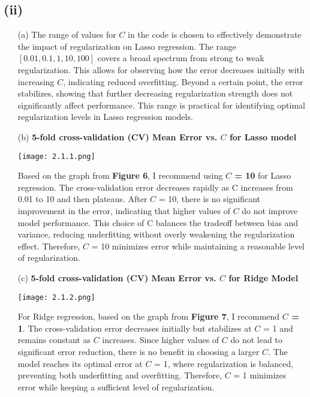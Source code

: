 \documentclass[a4paper,10pt]{article}
\begin{document}
    \subsection*{(ii)}
\begin{enumerate}
\item [(a)]
 The range of values for \( C \) in the code is chosen to effectively demonstrate the impact of regularization on Lasso regression. The range \([0.01, 0.1, 1, 10, 100]\) covers a broad spectrum from strong to weak regularization. This allows for observing how the error decreases initially with increasing \( C \), indicating reduced overfitting. Beyond a certain point, the error stabilizes, showing that further decreasing regularization strength does not significantly affect performance. This range is practical for identifying optimal regularization levels in Lasso regression models.
 \newpage
    \item[(b)] \textbf{5-fold cross-validation (CV) Mean Error vs.  \textbf{\(C\)} for Lasso model}
     \begin{center}
\centering
        \texttt{[image: 2.1.1.png]}
    \end{center}
    Based on the graph from \textbf{Figure 6}, I recommend using \textbf{\(C\) = 10} for Lasso regression. The cross-validation error decreases rapidly as C increases from 0.01 to 10 and then plateaus. After \(C\) = 10, there is no significant improvement in the error, indicating that higher values of \(C\) do not improve model performance. This choice of C balances the tradeoff between bias and variance, reducing underfitting without overly weakening the regularization effect. Therefore, \(C\) = 10 minimizes error while maintaining a reasonable level of regularization.
\item[(c)] \textbf{5-fold cross-validation (CV) Mean Error vs.  \textbf{\(C\)} for Ridge Model}
     \begin{center}
\centering
        \texttt{[image: 2.1.2.png]}
    \end{center}
    For Ridge regression, based on the graph from \textbf{Figure 7}, I recommend \textbf{\(C\) = 1}. The cross-validation error decreases initially but stabilizes at \(C\) = 1 and remains constant as \(C\) increases. Since higher values of \(C\) do not lead to significant error reduction, there is no benefit in choosing a larger \(C\). The model reaches its optimal error at \(C\) = 1, where regularization is balanced, preventing both underfitting and overfitting. Therefore, \(C\) = 1 minimizes error while keeping a sufficient level of regularization.

\end{enumerate}
\end{document}
